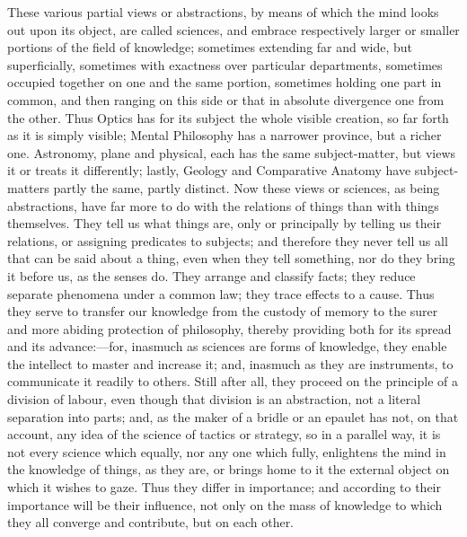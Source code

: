 These various partial views or abstractions, by means of which the
mind looks out upon its object, are called sciences, and embrace
respectively larger or smaller portions of the field of knowledge;
sometimes extending far and wide, but superficially, sometimes with
exactness over particular departments, sometimes occupied together on
one and the same portion, sometimes holding one part in common, and
then ranging on this side or that in absolute divergence one from the
other. Thus Optics has for its subject the whole visible creation, so
far forth as it is simply visible; Mental Philosophy has a narrower
province, but a richer one. Astronomy, plane and physical, each has
the same subject-matter, but views it or treats it differently;
lastly, Geology and Comparative Anatomy have subject-matters partly
the same, partly distinct. Now these views or sciences, as being
abstractions, have far more to do with the relations of things than
with things themselves. They tell us what things are, only or
principally by telling us their relations, or assigning predicates to
subjects; and therefore they never tell us all that can be said about
a thing, even when they tell something, nor do they bring it before
us, as the senses do. They arrange and classify facts; they reduce
separate phenomena under a common law; they trace effects to a cause.
Thus they serve to transfer our knowledge from the custody of memory
to the surer and more abiding protection of philosophy, thereby
providing both for its spread and its advance:—for, inasmuch as
sciences are forms of knowledge, they enable the intellect to master
and increase it; and, inasmuch as they are instruments, to communicate
it readily to others. Still after all, they proceed on the
principle of a division of labour, even though that division is an
abstraction, not a literal separation into parts; and, as the maker of
a bridle or an epaulet has not, on that account, any idea of the
science of tactics or strategy, so in a parallel way, it is not every
science which equally, nor any one which fully, enlightens the mind in
the knowledge of things, as they are, or brings home to it the
external object on which it wishes to gaze. Thus they differ in
importance; and according to their importance will be their influence,
not only on the mass of knowledge to which they all converge and
contribute, but on each other.

